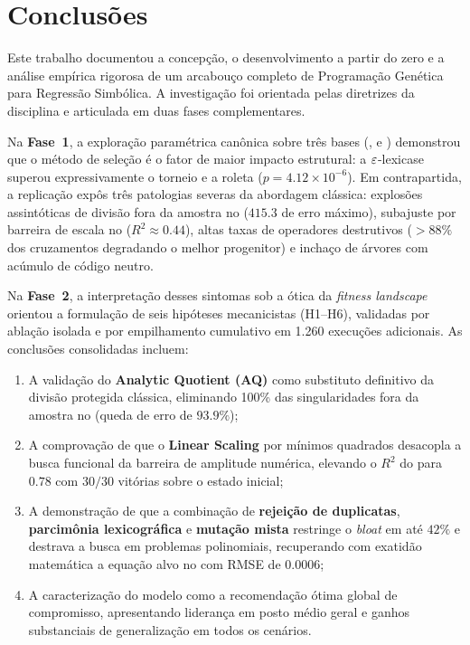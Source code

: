 \section{Conclusões}
\label{sec:conclusoes}
\label{sec:conclusao}

Este trabalho documentou a concepção, o desenvolvimento a partir do zero e a
análise empírica rigorosa de um arcabouço completo de Programação Genética para
Regressão Simbólica. A investigação foi orientada pelas diretrizes da
disciplina e articulada em duas fases complementares.

Na \textbf{Fase~1}, a exploração paramétrica canônica sobre três bases
(,  e ) demonstrou que o método de
seleção é o fator de maior impacto estrutural: a $\varepsilon$-lexicase superou
expressivamente o torneio e a roleta ($p = 4.12\times10^{-6}$). Em
contrapartida, a replicação expôs três patologias severas da abordagem
clássica: explosões assintóticas de divisão fora da amostra no 
($415.3$ de erro máximo), subajuste por barreira de escala no 
($R^2 \approx 0.44$), altas taxas de operadores destrutivos ($>88\%$ dos
cruzamentos degradando o melhor progenitor) e inchaço de árvores com
acúmulo de código neutro.

Na \textbf{Fase~2}, a interpretação desses sintomas sob a ótica da
\emph{fitness landscape} orientou a formulação de seis hipóteses mecanicistas
(H1--H6), validadas por ablação isolada e por empilhamento cumulativo em 1.260
execuções adicionais. As conclusões consolidadas incluem:
\begin{enumerate}
  \item A validação do \textbf{Analytic Quotient (AQ)} como substituto
        definitivo da divisão protegida clássica, eliminando 100\% das
        singularidades fora da amostra no  (queda de erro de
        $93.9\%$);
  \item A comprovação de que o \textbf{Linear Scaling} por mínimos quadrados
        desacopla a busca funcional da barreira de amplitude numérica,
        elevando o $R^2$ do  para $0.78$ com $30/30$ vitórias
        sobre o estado inicial;
  \item A demonstração de que a combinação de \textbf{rejeição de duplicatas},
        \textbf{parcimônia lexicográfica} e \textbf{mutação mista} restringe
        o \emph{bloat} em até $42\%$ e destrava a busca em problemas
        polinomiais, recuperando com exatidão matemática a equação alvo no
         com RMSE de $0.0006$;
  \item A caracterização do modelo \textbf{} como a recomendação
        ótima global de compromisso, apresentando liderança em posto médio
        geral e ganhos substanciais de generalização em todos os cenários.
\end{enumerate}

